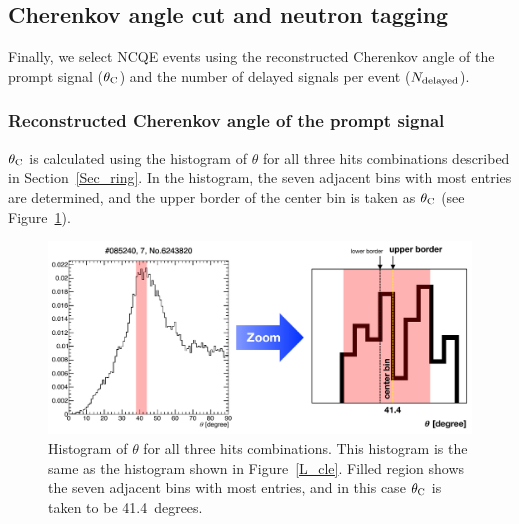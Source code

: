 \subsection{Cherenkov angle cut and neutron tagging}\label{Sec_theta_delayed}
\vs\hs
Finally, we select NCQE events using the reconstructed Cherenkov angle of the prompt signal ($\theta_{{\rm C}}$) and the number of delayed signals per event ($N_{{\rm delayed}}$).

\subsubsection{Reconstructed Cherenkov angle of the prompt signal}
\vs\hs
$\theta_{{\rm C}}$ is calculated using the histogram of $\theta$ for all three hits combinations described in Section~\ref{Sec_ring}.
In the histogram, the seven adjacent bins with most entries are determined, and the upper border of the center bin is taken as $\theta_{\rm C}$ (see Figure~\ref{theta_C}).

\begin{figure}[h]
	\centering
	\includegraphics[width=12cm]{Figures/Selection/theta_C_03}
	\caption[Histogram of $\theta$ for all three hits combinations]{
	Histogram of $\theta$ for all three hits combinations.
	This histogram is the same as the histogram shown in Figure~\ref{L_cle}.
	Filled region shows the seven adjacent bins with most entries, and in this case $\theta_{\rm C}$ is taken to be 41.4~degrees.
	}\label{theta_C}
\end{figure}

